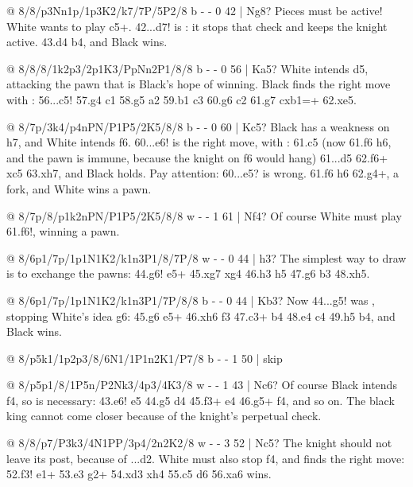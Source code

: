 @ 8/8/p3Nn1p/1p3K2/k7/7P/5P2/8 b - - 0 42 | Ng8?
Pieces must be active! White wants to play \N c5+. 42...\N d7! is :
it stops that check and keeps the knight active. 43.\N d4 b4, and Black wins.

@ 8/8/8/1k2p3/2p1K3/PpNn2P1/8/8 b - - 0 56 | Ka5?
White intends \K d5, attacking the pawn that is Black's hope of winning. Black finds the right move
with : 56...\K c5! 57.g4 \N c1 58.g5 \N a2 59.\N b1
c3 60.g6 c2 61.g7 cxb1=\Q+ 62.\K xe5.

@ 8/7p/3k4/p4nPN/P1P5/2K5/8/8 b - - 0 60 | Kc5?
Black has a weakness on h7, and White intends \N f6. 60...\K e6! is the right move, with
: 61.c5 (now 61.\N f6 h6, and the pawn is immune,
because the knight on f6 would hang) 61...\K d5 62.\N f6+ \K xc5 63.\N xh7, and Black holds.
Pay attention: 60...\K e5? is wrong. 61.\N f6 h6 62.\N g4+, a fork, and White wins
a pawn.

@ 8/7p/8/p1k2nPN/P1P5/2K5/8/8 w - - 1 61 | Nf4?
Of course White must play 61.\N f6!, winning a pawn.

@ 8/6p1/7p/1p1N1K2/k1n3P1/8/7P/8 w - - 0 44 | h3?
The simplest way to draw is to exchange the pawns:
44.\K g6! \N e5+ 45.\K xg7 \N xg4 46.h3 h5 47.\K g6 \K b3 48.\K xh5.

@ 8/6p1/7p/1p1N1K2/k1n3P1/7P/8/8 b - - 0 44 | Kb3?
Now 44...g5! was , stopping White's idea \K g6:
45.\K g6 \N e5+ 46.\K xh6 \N f3 47.\N c3+ \K b4 48.\N e4 \K c4 49.\K h5 b4, and Black wins.

@ 8/p5k1/1p2p3/8/6N1/1P1n2K1/P7/8 b - - 1 50 | skip

@ 8/p5p1/8/1P5n/P2Nk3/4p3/4K3/8 w - - 1 43 | Nc6?
Of course Black intends \N f4, so  is necessary:
43.\N e6! \K e5 44.\N g5 \K d4 45.\N f3+ \K e4 46.\N g5+ \K f4, and so on. The black king cannot
come closer because of the knight's perpetual check.

@ 8/8/p7/P3k3/4N1PP/3p4/2n2K2/8 w - - 3 52 | Nc5?
The knight should not leave its post, because of ...d2. White must also stop \K f4, and
 finds the right move: 52.\K f3! \N e1+ 53.\K e3
\N g2+ 54.\K xd3 \N xh4 55.\N c5 \K d6 56.\N xa6 wins.

